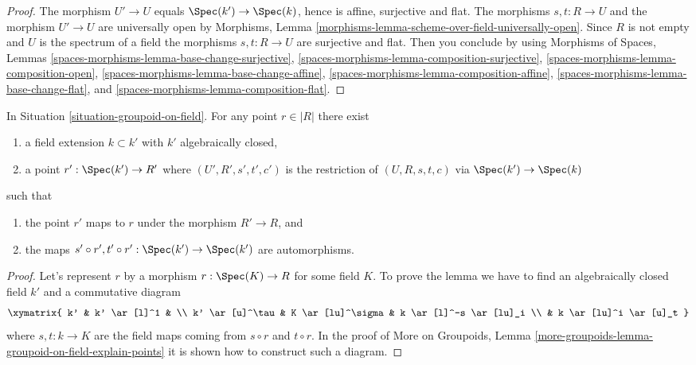 \begin{proof}
The morphism $U' \to U$ equals $\Spec(k') \to \Spec(k)$,
hence is affine, surjective and flat. The morphisms $s, t : R \to U$
and the morphism $U' \to U$ are universally open by
Morphisms, Lemma \ref{morphisms-lemma-scheme-over-field-universally-open}.
Since $R$ is not empty and $U$ is the spectrum of a field the morphisms
$s, t : R \to U$ are surjective and flat. Then you conclude by using
Morphisms of Spaces, Lemmas
\ref{spaces-morphisms-lemma-base-change-surjective},
\ref{spaces-morphisms-lemma-composition-surjective},
\ref{spaces-morphisms-lemma-composition-open},
\ref{spaces-morphisms-lemma-base-change-affine},
\ref{spaces-morphisms-lemma-composition-affine},
\ref{spaces-morphisms-lemma-base-change-flat}, and
\ref{spaces-morphisms-lemma-composition-flat}.
\end{proof}

\begin{lemma}
\label{lemma-groupoid-on-field-explain-points}
In
Situation \ref{situation-groupoid-on-field}.
For any point $r \in |R|$ there exist
\begin{enumerate}
\item a field extension $k \subset k'$ with $k'$ algebraically closed,
\item a point $r' : \Spec(k') \to R'$ where
$(U', R', s', t', c')$ is the restriction of $(U, R, s, t, c)$
via $\Spec(k') \to \Spec(k)$
\end{enumerate}
such that
\begin{enumerate}
\item the point $r'$ maps to $r$ under the morphism $R' \to R$, and
\item the maps
$s' \circ r', t' \circ r' : \Spec(k') \to \Spec(k')$
are automorphisms.
\end{enumerate}
\end{lemma}

\begin{proof}
Let's represent $r$ by a morphism $r : \Spec(K) \to R$ for some
field $K$. To prove the lemma we have to find an algebraically closed
field $k'$ and a commutative diagram
$$
\xymatrix{
k' & k' \ar[l]^1 & \\
k' \ar[u]^\tau & K \ar[lu]^\sigma & k \ar[l]^-s \ar[lu]_i \\
& k \ar[lu]^i \ar[u]_t
}
$$
where $s, t : k \to K$ are the field maps coming from
$s \circ r$ and $t \circ r$. In the proof of
More on Groupoids,
Lemma \ref{more-groupoids-lemma-groupoid-on-field-explain-points}
it is shown how to construct such a diagram.
\end{proof}

